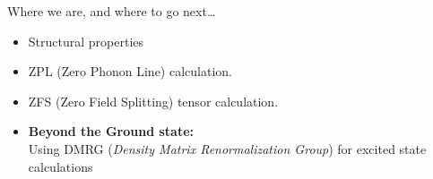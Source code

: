 \documentclass[notes=hide]{beamer}
\begin{document}
\begin{frame}{Where we are, and where to go next\ldots}
  \begin{itemize}
    \item Structural properties
    \item ZPL (Zero Phonon Line) calculation.
    \item ZFS (Zero Field Splitting) tensor calculation.
    \item \textbf{Beyond the Ground state:}\\
      Using DMRG (\textit{Density Matrix Renormalization Group}) for excited state calculations
  \end{itemize}
\end{frame}




\end{document}
